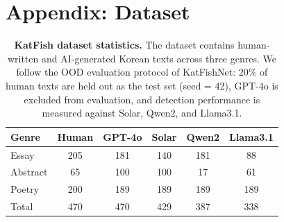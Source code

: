 \documentclass{article}
\begin{document}
\section{Appendix: Dataset}
\begin{table}[h]
\centering
\caption{\textbf{KatFish dataset statistics.} The dataset contains human-written and AI-generated Korean texts across three genres. We follow the OOD evaluation protocol of KatFishNet: 20\% of human texts are held out as the test set (seed = 42), GPT-4o is excluded from evaluation, and detection performance is measured against Solar, Qwen2, and Llama3.1.}
\label{tab:dataset}
\begin{tabular}{lccccc}
\toprule
Genre & Human & GPT-4o & Solar & Qwen2 & Llama3.1 \\
\midrule
Essay & 205 & 181 & 140 & 181 & 88 \\
Abstract & 65 & 100 & 100 & 17 & 61 \\
Poetry & 200 & 189 & 189 & 189 & 189 \\
\midrule
Total & 470 & 470 & 429 & 387 & 338 \\
\bottomrule
\end{tabular}
\end{table}
\end{document}
